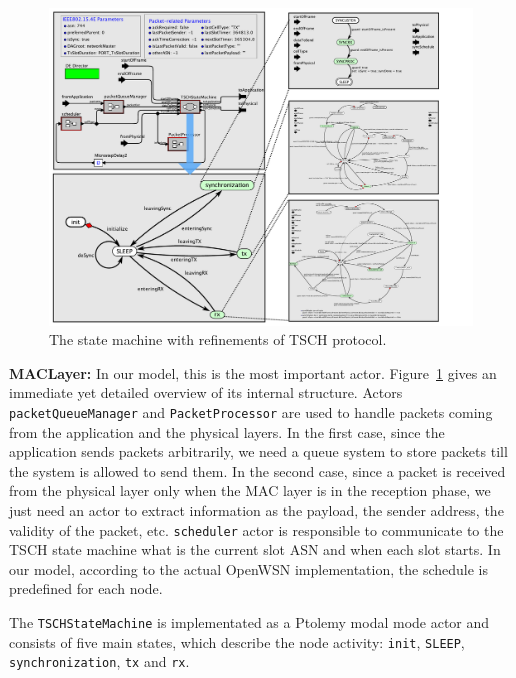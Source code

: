 \begin{figure}[t]
\centering
\includegraphics[width=\textwidth]{figures/PaperTSCHStateMachine}
\caption{The state machine with refinements of TSCH protocol.}
\label{fig:TSCHSM}
\end{figure}

{\bf MACLayer:} In our model, this is the most important actor. Figure~\ref{fig:TSCHSM} gives an immediate yet detailed overview of its internal structure.
Actors \texttt{packetQueueManager} and \texttt{PacketProcessor} are used to handle packets coming from the application and the physical layers. In the first case, since the application sends packets arbitrarily, we need a queue system to store packets till the system is allowed to send them. In the second case, since a packet is received from the physical layer only when the MAC layer is in the reception phase, we just need an actor to extract information as the payload, the sender address, the validity of the packet, etc.
\texttt{scheduler} actor is responsible to communicate to the TSCH state machine what is the current slot ASN and when each slot starts. In our model, according to the actual OpenWSN implementation, the schedule is predefined for each node. 

The \texttt{TSCHStateMachine} is implementated as a Ptolemy modal mode actor and consists of five main states, which describe the node activity: \texttt{init}, \texttt{SLEEP}, \texttt{synchronization}, \texttt{tx} and \texttt{rx}. 

